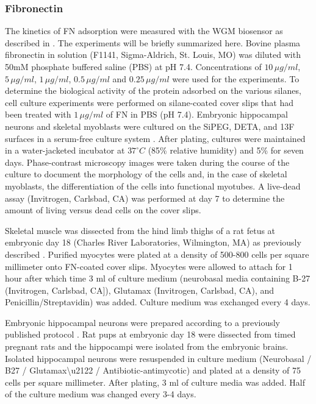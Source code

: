 \subsubsection{Fibronectin}

The kinetics of FN adsorption were measured with the WGM biosensor
as described in \cite{Wilson2011}. The experiments will be briefly
summarized here. Bovine plasma fibronectin in solution (F1141, Sigma-Aldrich,
St. Louis, MO) was diluted with 50mM phosphate buffered saline (PBS)
at pH 7.4. Concentrations of $10\,\mu g/ml$, $5\,\mu g/ml$, $1\,\mu g/ml$,
$0.5\,\mu g/ml$ and $0.25\,\mu g/ml$ were used for the experiments.
To determine the biological activity of the protein adsorbed on the
various silanes, cell culture experiments were performed on silane-coated
cover slips that had been treated with $1\,\mu g/ml$ of FN in PBS
(pH 7.4). Embryonic hippocampal neurons and skeletal myoblasts were
cultured on the SiPEG, DETA, and 13F surfaces in a serum-free culture
system \cite{Brewer1995,Das2007}. After plating, cultures were maintained
in a water-jacketed incubator at $37^{\circ}C$ (85\% relative humidity)
and 5\%  for seven days. Phase-contrast microscopy
images were taken during the course of the culture to document the
morphology of the cells and, in the case of skeletal myoblasts, the
differentiation of the cells into functional myotubes. A live-dead
assay (Invitrogen, Carlsbad, CA) was performed at day 7 to determine
the amount of living versus dead cells on the cover slips.

Skeletal muscle was dissected from the hind limb thighs of a rat fetus
at embryonic day 18 (Charles River Laboratories, Wilmington, MA) as
previously described \cite{Wilson2011}. Purified myocytes were plated
at a density of 500-800 cells per square millimeter onto FN-coated
cover slips. Myocytes were allowed to attach for 1 hour after which
time 3 ml of culture medium (neurobasal media containing B-27 (Invitrogen,
Carlsbad, CA{]}), Glutamax (Invitrogen, Carlsbad, CA), and Penicillin/Streptavidin)
was added. Culture medium was exchanged every 4 days. 

Embryonic hippocampal neurons were prepared according to a previously
published protocol \cite{Wilson2011}. Rat pups at embryonic day 18
were dissected from timed pregnant rats and the hippocampi were isolated
from the embryonic brains. Isolated hippocampal neurons were resuspended
in culture medium (Neurobasal / B27 / Glutamax\textbackslash{}u2122
/ Antibiotic-antimycotic) and plated at a density of 75 cells per
square millimeter. After plating, 3 ml of culture media was added.
Half of the culture medium was changed every 3-4 days. 


